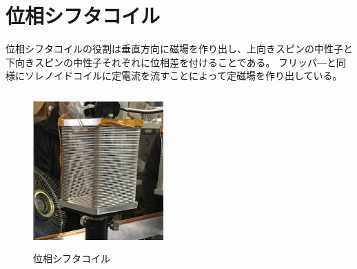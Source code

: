 \section{位相シフタコイル}
位相シフタコイルの役割は垂直方向に磁場を作り出し、上向きスピンの中性子と下向きスピンの中性子それぞれに位相差を付けることである。
フリッパ―と同様にソレノイドコイルに定電流を流すことによって定磁場を作り出している。
\begin{figure}[H]
\centering
\includegraphics[width=5cm,height=6cm]{device/shifterphoto.pdf}\caption{位相シフタコイル}
\end{figure}
